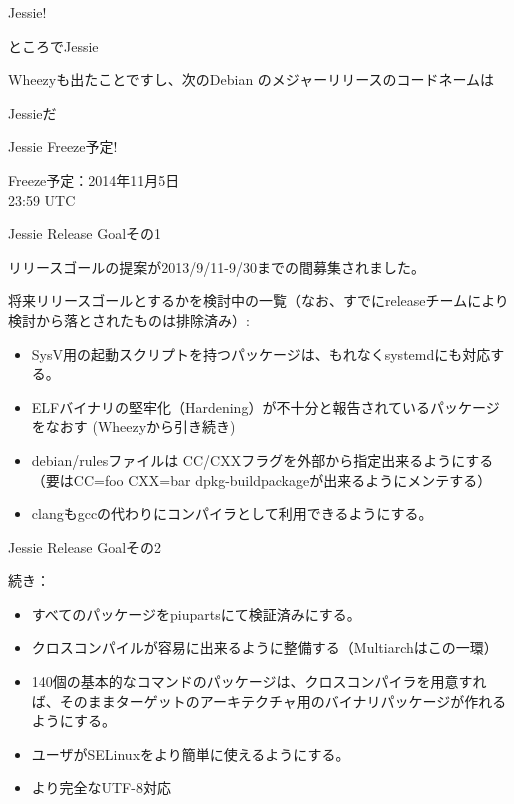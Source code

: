 \begin{frame}
\begin{center}
\LARGE
Jessie!
\end{center}
\end{frame}


\begin{frame}{ところでJessie}

 Wheezyも出たことですし、次のDebian のメジャーリリースのコードネームは\\

 \begin{center}
 \LARGE
 Jessieだ
 \end{center} 

\end{frame}

\begin{frame}{Jessie Freeze予定!}

 \begin{center}
 \LARGE
 Freeze予定：2014年11月5日\\
 23:59 UTC
 \end{center}

\end{frame}

\begin{frame}{Jessie Release Goalその1}

リリースゴールの提案が2013/9/11-9/30までの間募集されました。

将来リリースゴールとするかを検討中の一覧（なお、すでにreleaseチームにより検討から落とされたものは排除済み）:\\
\begin{itemize}
\item SysV用の起動スクリプトを持つパッケージは、もれなくsystemdにも対応する。
\item ELFバイナリの堅牢化（Hardening）が不十分と報告されているパッケージをなおす (Wheezyから引き続き)
\item debian/rulesファイルは CC/CXXフラグを外部から指定出来るようにする
（要はCC=foo CXX=bar dpkg-buildpackageが出来るようにメンテする）
\item clangもgccの代わりにコンパイラとして利用できるようにする。
\end{itemize}

\end{frame}
\begin{frame}{Jessie Release Goalその2}

続き：
\begin{itemize}
\item すべてのパッケージをpiupartsにて検証済みにする。
\item クロスコンパイルが容易に出来るように整備する（Multiarchはこの一環）
\item 140個の基本的なコマンドのパッケージは、クロスコンパイラを用意すれば、そのままターゲットのアーキテクチャ用のバイナリパッケージが作れるようにする。
\item ユーザがSELinuxをより簡単に使えるようにする。
\item より完全なUTF-8対応
\end{itemize}

\end{frame}

